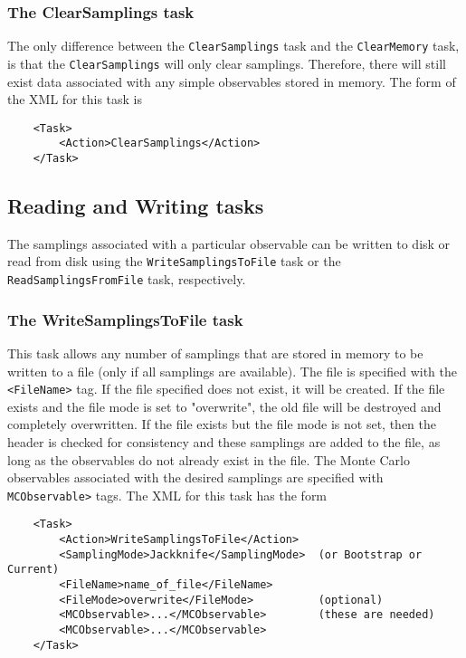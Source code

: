 \documentclass[12pt]{article}
\newcommand{\vb}{\texttt}
\begin{document}
\subsubsection{The ClearSamplings task}
The only difference between the \vb{ClearSamplings} task and
the \vb{ClearMemory} task, is that the \vb{ClearSamplings} will
only clear samplings. Therefore, there will still exist data
associated with any simple observables stored in memory.
The form of the XML for this task is
\begin{verbatim}
    <Task>
        <Action>ClearSamplings</Action>
    </Task>
\end{verbatim}

\subsection{Reading and Writing tasks}

The samplings associated with a particular observable can be
written to disk or read from disk using the
\vb{WriteSamplingsToFile} task or the \vb{ReadSamplingsFromFile} task, respectively.

\subsubsection{The WriteSamplingsToFile task}
This task allows any number of samplings that are stored in memory to be written
to a file (only if all samplings are available).
The file is specified with the \vb{<FileName>} tag.
If the file specified does not exist, it will be created. If the file
exists and the file mode is set to "overwrite", the old file will be destroyed
and completely overwritten.  If the file exists but the file mode is not set,
then the header is checked for consistency and these
samplings are added to the file, as long as the observables do
not already exist in the file.
The Monte Carlo observables associated with the desired samplings are
specified with \vb{MCObservable>} tags.
The XML for this task has the form
\begin{verbatim}
    <Task> 
        <Action>WriteSamplingsToFile</Action> 
        <SamplingMode>Jackknife</SamplingMode>  (or Bootstrap or Current) 
        <FileName>name_of_file</FileName> 
        <FileMode>overwrite</FileMode>          (optional) 
        <MCObservable>...</MCObservable>        (these are needed) 
        <MCObservable>...</MCObservable> 
    </Task>
\end{verbatim}
\end{document}
